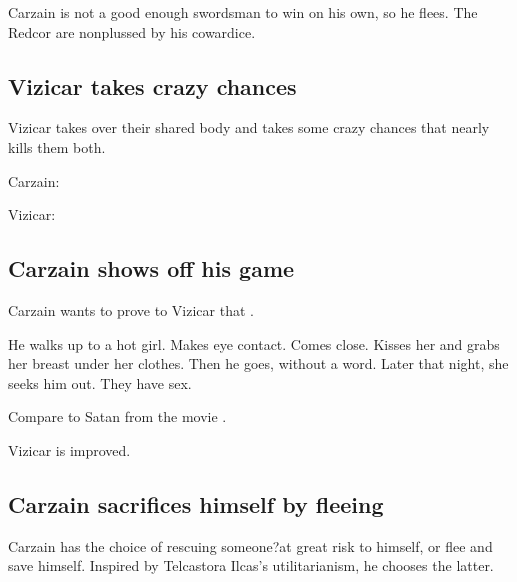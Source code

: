 Carzain is not a good enough swordsman to win on his own, so he flees. The Redcor are nonplussed by his cowardice. 










\subsection{Vizicar takes crazy chances}
Vizicar takes over their shared body and takes some crazy chances that nearly kills them both. 

\begin{prose}
  Carzain: 
  
  Vizicar: 
\end{prose}










\subsection{Carzain shows off his game}
Carzain wants to prove to Vizicar that . 

He walks up to a hot girl. 
Makes eye contact. 
Comes close. 
Kisses her and grabs her breast under her clothes. 
Then he goes, without a word. 
Later that night, she seeks him out. 
They have sex. 

Compare to Satan from the movie \cite{Movie:EndofDays}.

Vizicar is improved. 









\subsection{Carzain sacrifices himself by fleeing}
Carzain has the choice of rescuing someone\dash\Racel?\dash at great risk to himself, or flee and save himself. Inspired by Telcastora Ilcas's utilitarianism, he chooses the latter. 

